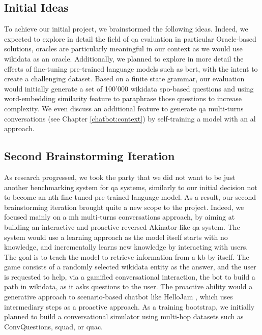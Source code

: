 \subsection{Initial Ideas}
To achieve our initial project, we brainstormed the following ideas. Indeed, we expected to explore in detail the field of \gls{qa} evaluation in particular Oracle-based solutions, oracles are particularly meaningful in our context as we would use \gls{wikidata} as an oracle. Additionally, we planned to explore in more detail the effects of fine-tuning pre-trained language models such as \gls{bert}, with the intent to create a challenging dataset. Based on a finite state grammar, our evaluation would initially generate a set of 100'000 \gls{wikidata} \gls{spo}-based questions and using word-embedding similarity feature to paraphrase those questions to increase complexity. We even discuss an additional feature to generate \gls{qa} multi-turns conversations (see Chapter \ref{chatbot:context}) by self-training a model with an \gls{al} approach.


\subsection{Second Brainstorming Iteration}
As research progressed, we took the party that we did not want to be just another benchmarking system for \gls{qa} systems, similarly to our initial decision not to become an nth fine-tuned pre-trained language model. As a result, our second brainstorming iteration brought quite a new scope to the project. Indeed, we focused mainly on a \gls{mh} multi-turns conversations approach, by aiming at building an interactive and proactive reversed Akinator-like \autocite{website:akinator} \gls{qa} system. The system would use a  learning approach as the model itself starts with no knowledge, and incrementally learns new knowledge by interacting with users. The goal is to teach the model to retrieve information from a \gls{kb} by itself. The game consists of a randomly selected \gls{wikidata} entity as the answer, and the user is requested to help, via a gamified conversational interaction, the bot to build a path in \gls{wikidata}, as it asks questions to the user. The proactive ability would a generative approach to scenario-based chatbot like HelloJam \autocite{website:hellojam}, which uses intermediary steps as a proactive approach. As a training bootstrap, we initially planned to build a conversational simulator using multi-hop datasets such as ConvQuestions, \gls{squad}, or \gls{quac}.


